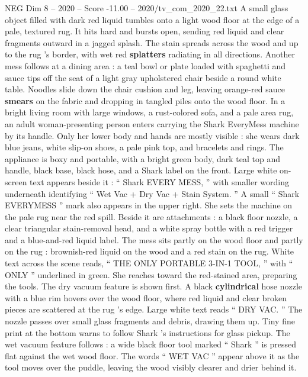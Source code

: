 \begin{textsample}{NEG Dim 8 – 2020 – Score -11.00 – 2020/tv\_com\_2020\_22.txt}  \label{ex:f8_neg_041}
A small glass object filled with dark red liquid tumbles onto a light wood floor at the edge of a pale, textured rug.
It hits hard and bursts open, sending red liquid and clear fragments outward in a jagged splash.
The stain spreads across the wood and up to the rug ’s border, with wet red \textbf{splatters} radiating in all directions.
Another mess follows at a dining area : a teal bowl or plate loaded with spaghetti and sauce tips off the seat of a light gray upholstered chair beside a round white table.
Noodles slide down the chair cushion and leg, leaving orange-red sauce \textbf{smears} on the fabric and dropping in tangled piles onto the wood floor.
In a bright living room with large windows, a rust-colored sofa, and a pale area rug, an adult woman-presenting person enters carrying the Shark EveryMess machine by its handle.
Only her lower body and hands are mostly visible : she wears dark blue jeans, white slip-on shoes, a pale pink top, and bracelets and rings.
The appliance is boxy and portable, with a bright green body, dark teal top and handle, black base, black hose, and a Shark label on the front.
Large white on-screen text appears beside it : “ Shark EVERY MESS, ” with smaller wording underneath identifying “ Wet Vac + Dry Vac + Stain System. ” A small “ Shark EVERYMESS ” mark also appears in the upper right.
She sets the machine on the pale rug near the red spill.
Beside it are attachments : a black floor nozzle, a clear triangular stain-removal head, and a white spray bottle with a red trigger and a blue-and-red liquid label.
The mess sits partly on the wood floor and partly on the rug : brownish-red liquid on the wood and a red stain on the rug.
White text across the scene reads, “ THE ONLY PORTABLE 3-IN-1 TOOL, ” with “ ONLY ” underlined in green.
She reaches toward the red-stained area, preparing the tools.
The dry vacuum feature is shown first.
A black \textbf{cylindrical} hose nozzle with a blue rim hovers over the wood floor, where red liquid and clear broken pieces are scattered at the rug ’s edge.
Large white text reads “ DRY VAC. ” The nozzle passes over small glass fragments and debris, drawing them up.
Tiny fine print at the bottom warns to follow Shark ’s instructions for glass pickup.
The wet vacuum feature follows : a wide black floor tool marked “ Shark ” is pressed flat against the wet wood floor.
The words “ WET VAC ” appear above it as the tool moves over the puddle, leaving the wood visibly clearer and drier behind it.

\end{textsample}
